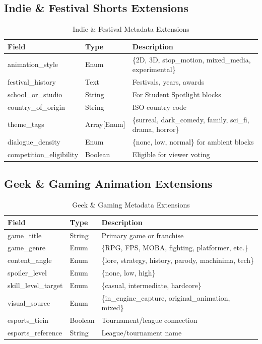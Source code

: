 \documentclass[12pt,letterpaper,twoside]{report}
\begin{document}
\subsection{Indie \& Festival Shorts Extensions}

\begin{table}[H]
\centering
\caption{Indie \& Festival Metadata Extensions}
\begin{tabular}{@{}L{4cm}L{3cm}L{6.5cm}@{}}
\toprule
\textbf{Field} & \textbf{Type} & \textbf{Description} \\
\midrule
animation\_\allowbreak style & Enum & \{2D, 3D, stop\_\allowbreak motion, mixed\_\allowbreak media, experimental\} \\
festival\_\allowbreak history & Text & Festivals, years, awards \\
school\_\allowbreak or\_\allowbreak studio & String & For Student Spotlight blocks \\
country\_\allowbreak of\_\allowbreak origin & String & ISO country code \\
theme\_\allowbreak tags & Array[Enum] & \{surreal, dark\_\allowbreak comedy, family, sci\_\allowbreak fi, drama, horror\} \\
dialogue\_\allowbreak density & Enum & \{none, low, normal\} for ambient blocks \\
competition\_\allowbreak eligibility & Boolean & Eligible for viewer voting \\
\bottomrule
\end{tabular}
\end{table}

\subsection{Geek \& Gaming Animation Extensions}

\begin{table}[H]
\centering
\caption{Geek \& Gaming Metadata Extensions}
\begin{tabular}{@{}L{4cm}L{3cm}L{6.5cm}@{}}
\toprule
\textbf{Field} & \textbf{Type} & \textbf{Description} \\
\midrule
game\_\allowbreak title & String & Primary game or franchise \\
game\_\allowbreak genre & Enum & \{RPG, FPS, MOBA, fighting, platformer, etc.\} \\
content\_\allowbreak angle & Enum & \{lore, strategy, history, parody, machinima, tech\} \\
spoiler\_\allowbreak level & Enum & \{none, low, high\} \\
skill\_\allowbreak level\_\allowbreak target & Enum & \{casual, intermediate, hardcore\} \\
visual\_\allowbreak source & Enum & \{in\_\allowbreak engine\_\allowbreak capture, original\_\allowbreak animation, mixed\} \\
esports\_\allowbreak tiein & Boolean & Tournament/league connection \\
esports\_\allowbreak reference & String & League/tournament name \\
\bottomrule
\end{tabular}
\end{table}
\end{document}
